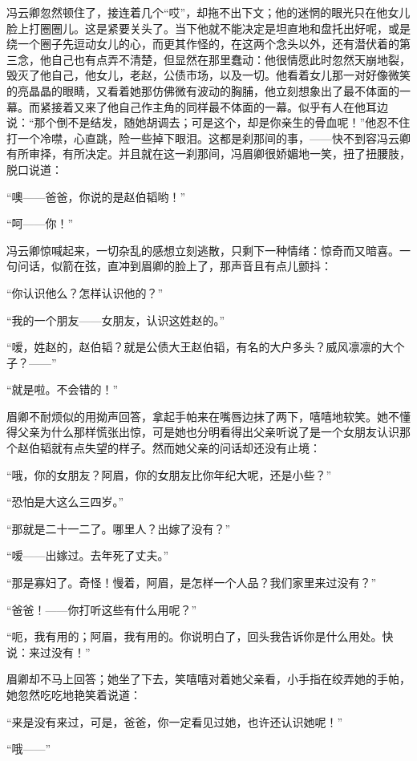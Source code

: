 \par 冯云卿忽然顿住了，接连着几个“哎”，却拖不出下文；他的迷惘的眼光只在他女儿脸上打圈圈儿。这是紧要关头了。当下他就不能决定是坦直地和盘托出好呢，或是绕一个圈子先逗动女儿的心，而更其作怪的，在这两个念头以外，还有潜伏着的第三念，他自己也有点弄不清楚，但显然在那里蠢动：他很情愿此时忽然天崩地裂，毁灭了他自己，他女儿，老赵，公债市场，以及一切。他看着女儿那一对好像微笑的亮晶晶的眼睛，又看着她那仿佛微有波动的胸脯，他立刻想象出了最不体面的一幕。而紧接着又来了他自己作主角的同样最不体面的一幕。似乎有人在他耳边说：“那个倒不是结发，随她胡调去；可是这个，却是你亲生的骨血呢！”他忍不住打一个冷噤，心直跳，险一些掉下眼泪。这都是刹那间的事，——快不到容冯云卿有所审择，有所决定。并且就在这一刹那间，冯眉卿很娇媚地一笑，扭了扭腰肢，脱口说道：
\par “噢——爸爸，你说的是赵伯韬哟！”
\par “呵——你！”
\par 冯云卿惊喊起来，一切杂乱的感想立刻逃散，只剩下一种情绪：惊奇而又暗喜。一句问话，似箭在弦，直冲到眉卿的脸上了，那声音且有点儿颤抖：
\par “你认识他么？怎样认识他的？”
\par “我的一个朋友——女朋友，认识这姓赵的。”
\par “嗳，姓赵的，赵伯韬？就是公债大王赵伯韬，有名的大户多头？威风凛凛的大个子？——”
\par “就是啦。不会错的！”
\par 眉卿不耐烦似的用拗声回答，拿起手帕来在嘴唇边抹了两下，嘻嘻地软笑。她不懂得父亲为什么那样慌张出惊，可是她也分明看得出父亲听说了是一个女朋友认识那个赵伯韬就有点失望的样子。然而她父亲的问话却还没有止境：
\par “哦，你的女朋友？阿眉，你的女朋友比你年纪大呢，还是小些？”
\par “恐怕是大这么三四岁。”
\par “那就是二十一二了。哪里人？出嫁了没有？”
\par “嗳——出嫁过。去年死了丈夫。”
\par “那是寡妇了。奇怪！慢着，阿眉，是怎样一个人品？我们家里来过没有？”
\par “爸爸！——你打听这些有什么用呢？”
\par “呃，我有用的；阿眉，我有用的。你说明白了，回头我告诉你是什么用处。快说：来过没有！”
\par 眉卿却不马上回答；她坐了下去，笑嘻嘻对着她父亲看，小手指在绞弄她的手帕，她忽然吃吃地艳笑着说道：
\par “来是没有来过，可是，爸爸，你一定看见过她，也许还认识她呢！”
\par “哦——”
